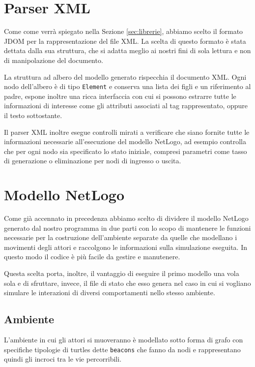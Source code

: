 \section{Parser XML}
\label{subsec:parser-builder}

Come come verrà spiegato nella Sezione \ref{sec:librerie}, abbiamo scelto il formato JDOM per la rappresentazione del file XML. La scelta di questo formato è stata dettata dalla sua struttura, che si adatta meglio ai nostri fini di sola lettura e non di manipolazione del documento.

La struttura ad albero del modello generato rispecchia il documento XML. Ogni nodo dell'albero è di tipo \texttt{Element} e conserva una lista dei figli e un riferimento al padre, espone inoltre una ricca interfaccia con cui si possono estrarre tutte le informazioni di interesse come gli attributi associati al tag rappresentato, oppure il testo sottostante.

Il parser XML inoltre esegue controlli mirati a verificare che siano fornite tutte le informazioni necessarie all'esecuzione del modello NetLogo, ad esempio controlla che per ogni nodo sia specificato lo stato iniziale, compresi parametri come tasso di generazione o eliminazione per nodi di ingresso o uscita.


\section{Modello NetLogo}
\label{sec:modello-netlogo}

Come già accennato in precedenza abbiamo scelto di dividere il modello NetLogo generato dal nostro programma in due parti con lo scopo di mantenere le funzioni necessarie per la costruzione dell'ambiente separate da quelle che modellano i movimenti degli attori e raccolgono le informazioni sulla simulazione eseguita. In questo modo il codice è più facile da gestire e manutenere.

Questa scelta porta, inoltre, il vantaggio di eseguire il primo modello una vola sola e di sfruttare, invece, il file di stato che esso genera nel caso in cui si vogliano simulare le interazioni di diversi comportamenti nello stesso ambiente.
\subsection{Ambiente}
L'ambiente in cui gli attori si muoveranno è modellato sotto forma di grafo con specifiche tipologie di turtles dette \texttt{beacons} che fanno da nodi e rappresentano quindi gli incroci tra le vie percorribili.


